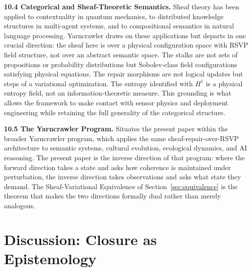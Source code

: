 \documentclass[12pt, oneside]{article}
\begin{document}
{\medskip
\textbf{10.4 Categorical and Sheaf-Theoretic Semantics.}
Sheaf theory has been applied to contextuality in quantum mechanics, to distributed
knowledge structures in multi-agent systems, and to compositional semantics in natural
language processing. Yarncrawler draws on these applications but departs in one crucial
direction: the sheaf here is over a physical configuration space with RSVP field structure,
not over an abstract semantic space. The stalks are not sets of propositions or probability
distributions but Sobolev-class field configurations satisfying physical equations. The
repair morphisms are not logical updates but steps of a variational optimization. The
entropy identified with $H^1$ is a physical entropy field, not an information-theoretic
measure. This grounding is what allows the framework to make contact with sensor physics
and deployment engineering while retaining the full generality of the categorical structure.

\medskip
\textbf{10.5 The Yarncrawler Program.}
Situates the present paper within the broader Yarncrawler program, which applies the same
sheaf-repair-over-RSVP architecture to semantic systems, cultural evolution, ecological
dynamics, and AI reasoning. The present paper is the inverse direction of that program:
where the forward direction takes a state and asks how coherence is maintained under
perturbation, the inverse direction takes observations and asks what state they demand.
The Sheaf-Variational Equivalence of Section~\ref{sec:equivalence} is the theorem that
makes the two directions formally dual rather than merely analogous.
}

\section{Discussion: Closure as Epistemology}
\label{sec:epistemology}
\end{document}
